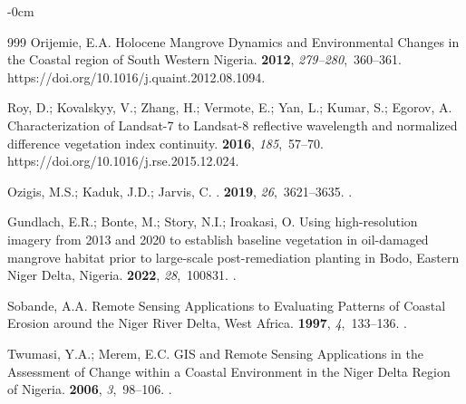 \documentclass[jmse,article,accept,pdftex,moreauthors]{Definitions/mdpi}
\begin{document}
\begin{adjustwidth}{-\extralength}{0cm}
\begin{thebibliography}{999}
Orijemie, E.A.
\newblock Holocene Mangrove Dynamics and Environmental Changes in the Coastal
  region of South Western Nigeria.
 {\bf 2012}, {\em 279--280},~360--361. 
  {{https://doi.org/10.1016/j.quaint.2012.08.1094}}. %

Roy, D.; Kovalskyy, V.; Zhang, H.; Vermote, E.; Yan, L.; Kumar, S.; Egorov, A.
\newblock Characterization of Landsat-7 to Landsat-8 reflective wavelength and
  normalized difference vegetation index continuity.
 {\bf 2016}, {\em 185},~57--70. %
{{https://doi.org/10.1016/j.rse.2015.12.024}}.

Ozigis, M.S.; Kaduk, J.D.; Jarvis, C.
.
 {\bf 2019}, {\em 26},~3621--3635.
.

Gundlach, E.R.; Bonte, M.; Story, N.I.; Iroakasi, O.
\newblock Using high-resolution imagery from 2013 and 2020 to establish
  baseline vegetation in oil-damaged mangrove habitat prior to large-scale
  post-remediation planting in Bodo, Eastern Niger Delta, Nigeria.
 {\bf 2022}, {\em
  28},~100831.
.

Sobande, A.A.
\newblock Remote Sensing Applications to Evaluating Patterns of Coastal Erosion
  around the Niger River Delta, West Africa.
 {\bf 1997}, {\em 4},~133--136.
.

Twumasi, Y.A.; Merem, E.C.
\newblock GIS and Remote Sensing Applications in the Assessment of Change
  within a Coastal Environment in the Niger Delta Region of Nigeria.
 {\bf 2006}, {\em
  3},~98--106.
.


\end{thebibliography}
\end{adjustwidth}
\end{document}
